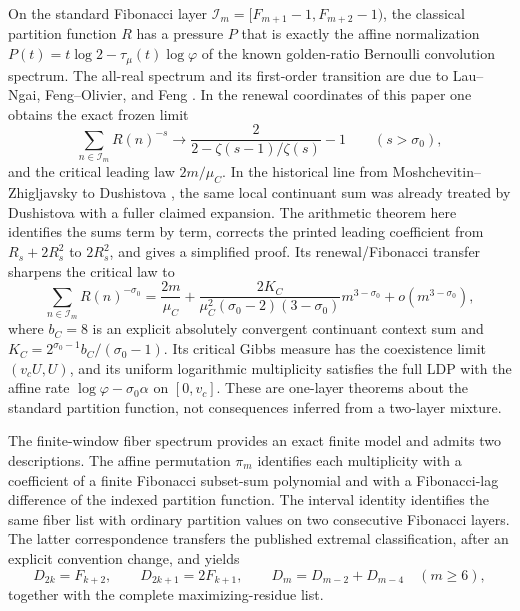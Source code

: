 On the standard Fibonacci layer
\(\mathcal I_m=[F_{m+1}-1,F_{m+2}-1)\), the classical partition function
\(R\) has a pressure \(P\) that is exactly the affine normalization
\(P(t)=t\log2-\tau_\mu(t)\log\varphi\) of the known golden-ratio Bernoulli
convolution spectrum.  The all-real spectrum and its first-order transition
are due to Lau--Ngai, Feng--Olivier, and Feng
\cite{LauNgai1998,FengOlivier2003,Feng2005}.  In the renewal coordinates of
this paper one obtains the exact frozen limit
\[
 \sum_{n\in\mathcal I_m}R(n)^{-s}
 \longrightarrow\frac2{2-\zeta(s-1)/\zeta(s)}-1
 \qquad(s>\sigma_0),
\]
 and the critical leading law \(2m/\mu_C\).  In the historical line from
 Moshchevitin--Zhigljavsky to Dushistova
 \cite{MoshchevitinZhigljavsky2004,Dushistova2007}, the same local continuant
 sum was already treated by Dushistova with a fuller claimed expansion.  The
 arithmetic theorem here identifies the sums term by term, corrects the
 printed leading coefficient from \(R_s+2R_s^2\) to \(2R_s^2\), and gives a
 simplified proof.  Its renewal/Fibonacci transfer sharpens the critical law
 to
 \[
  \sum_{n\in\mathcal I_m}R(n)^{-\sigma_0}
  =\frac{2m}{\mu_C}
  +\frac{2K_C}{\mu_C^2(\sigma_0-2)(3-\sigma_0)}m^{3-\sigma_0}
  +o(m^{3-\sigma_0}),
 \]
 where \(b_C=8\) is an explicit absolutely convergent continuant context sum
 and \(K_C=2^{\sigma_0-1}b_C/(\sigma_0-1)\).  Its critical Gibbs measure
has the coexistence limit \((v_cU,U)\), and its uniform logarithmic
multiplicity satisfies the full LDP with the affine rate
\(\log\varphi-\sigma_0\alpha\) on \([0,v_c]\).  These are one-layer theorems
about the standard partition function, not consequences inferred from a
two-layer mixture.

The finite-window fiber spectrum provides an exact finite model and admits
two descriptions.  The affine
permutation \(\pi_m\) identifies each multiplicity with a coefficient of a
finite Fibonacci subset-sum polynomial and with a Fibonacci-lag difference of
the indexed partition function.  The interval identity identifies the same
fiber list with ordinary partition values on two consecutive Fibonacci
layers.  The latter correspondence transfers the published extremal
classification, after an explicit convention change, and yields
\[
 D_{2k}=F_{k+2},\qquad D_{2k+1}=2F_{k+1},\qquad
 D_m=D_{m-2}+D_{m-4}\quad(m\ge6),
\]
together with the complete maximizing-residue list.

